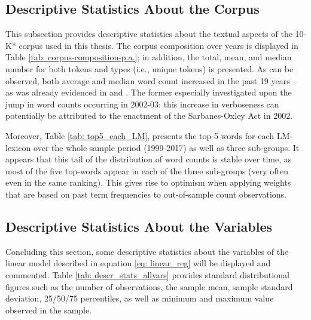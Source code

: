 \subsection{Descriptive Statistics About the Corpus}
\label{ssec: data_sample_desc-stats-corpus}

This subsection provides descriptive statistics about the textual aspects of the 10-K* corpus used in this thesis. The corpus composition over years is displayed in Table \ref{tab: corpus-composition-p.a.}; in addition, the total, mean, and median number for both tokens and types (i.e., unique tokens)  is presented. As can be observed, both average and median word count increased in the past 19 years -- as was already evidenced in \textcite{Kogan2009_1} and \textcite{Rekabsaz2017}. The former especially investigated upon the jump in word counts occurring in 2002-03: this increase  in verboseness can potentially be attributed to the enactment of the Sarbanes-Oxley Act in 2002.

Moreover, Table \ref{tab: top5_each_LM}, presents the top-5 words for each LM-lexicon over the whole sample period (1999-2017) as well as three sub-groups. It appears that this tail of the distribution of word counts is stable over time, as most of the five top-words appear in each of the three sub-groups (very often even in the same ranking). This gives rise to optimism when applying weights that are based on past term frequencies to out-of-sample count observations.

\subsection{Descriptive Statistics About the Variables}
\label{ssec: data_sample_desc-stats-variables}
Concluding this section, some descriptive statistics about the variables of the linear model described in equation \eqref{eq: linear_reg} will be displayed and commented. Table \ref{tab: descr_stats_allvars} provides standard distributional figures such as the number of observations, the sample mean, sample standard deviation, 25/50/75 percentiles, as well as minimum and maximum value observed in the sample.

